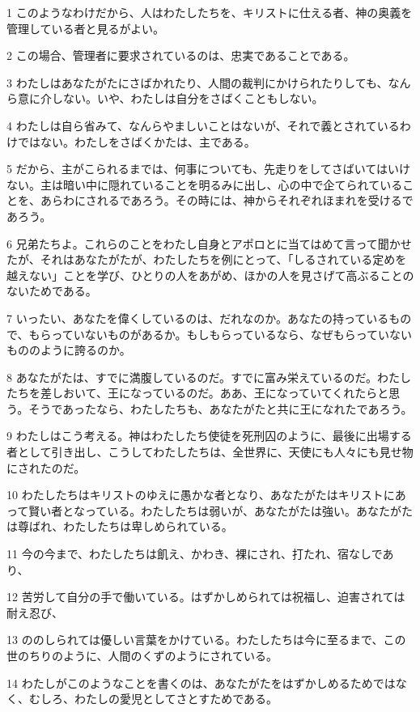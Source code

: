 \par 1 このようなわけだから、人はわたしたちを、キリストに仕える者、神の奥義を管理している者と見るがよい。
\par 2 この場合、管理者に要求されているのは、忠実であることである。
\par 3 わたしはあなたがたにさばかれたり、人間の裁判にかけられたりしても、なんら意に介しない。いや、わたしは自分をさばくこともしない。
\par 4 わたしは自ら省みて、なんらやましいことはないが、それで義とされているわけではない。わたしをさばくかたは、主である。
\par 5 だから、主がこられるまでは、何事についても、先走りをしてさばいてはいけない。主は暗い中に隠れていることを明るみに出し、心の中で企てられていることを、あらわにされるであろう。その時には、神からそれぞれほまれを受けるであろう。
\par 6 兄弟たちよ。これらのことをわたし自身とアポロとに当てはめて言って聞かせたが、それはあなたがたが、わたしたちを例にとって、「しるされている定めを越えない」ことを学び、ひとりの人をあがめ、ほかの人を見さげて高ぶることのないためである。
\par 7 いったい、あなたを偉くしているのは、だれなのか。あなたの持っているもので、もらっていないものがあるか。もしもらっているなら、なぜもらっていないもののように誇るのか。
\par 8 あなたがたは、すでに満腹しているのだ。すでに富み栄えているのだ。わたしたちを差しおいて、王になっているのだ。ああ、王になっていてくれたらと思う。そうであったなら、わたしたちも、あなたがたと共に王になれたであろう。
\par 9 わたしはこう考える。神はわたしたち使徒を死刑囚のように、最後に出場する者として引き出し、こうしてわたしたちは、全世界に、天使にも人々にも見せ物にされたのだ。
\par 10 わたしたちはキリストのゆえに愚かな者となり、あなたがたはキリストにあって賢い者となっている。わたしたちは弱いが、あなたがたは強い。あなたがたは尊ばれ、わたしたちは卑しめられている。
\par 11 今の今まで、わたしたちは飢え、かわき、裸にされ、打たれ、宿なしであり、
\par 12 苦労して自分の手で働いている。はずかしめられては祝福し、迫害されては耐え忍び、
\par 13 ののしられては優しい言葉をかけている。わたしたちは今に至るまで、この世のちりのように、人間のくずのようにされている。
\par 14 わたしがこのようなことを書くのは、あなたがたをはずかしめるためではなく、むしろ、わたしの愛児としてさとすためである。
